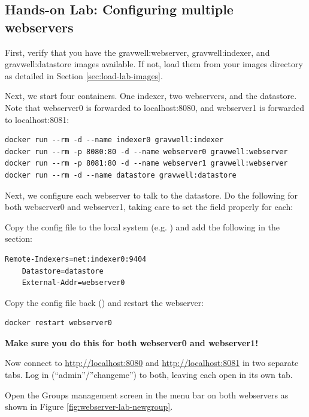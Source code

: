 \subsection{Hands-on Lab: Configuring multiple webservers}

First, verify that you have the gravwell:webserver, gravwell:indexer, and gravwell:datastore
images available. If not, load them from your images directory as detailed in
Section \ref{sec:load-lab-images}.

Next, we start four containers. One indexer, two webservers, and the
datastore. Note that webserver0 is forwarded to localhost:8080, and
webserver1 is forwarded to localhost:8081:

\begin{Verbatim}[breaklines=true]
docker run --rm -d --name indexer0 gravwell:indexer
docker run --rm -p 8080:80 -d --name webserver0 gravwell:webserver
docker run --rm -p 8081:80 -d --name webserver1 gravwell:webserver
docker run --rm -d --name datastore gravwell:datastore
\end{Verbatim}

Next, we configure each webserver to talk to the datastore. Do the
following for both webserver0 and webserver1, taking care to set the
 field properly for each:

Copy the config file to the local system
(e.g. )
and add the following in the \code{[Global]} section:

\begin{Verbatim}[breaklines=true]
    Remote-Indexers=net:indexer0:9404
    Datastore=datastore
    External-Addr=webserver0
\end{Verbatim}

Copy the config file back ()
and restart the webserver:

\begin{Verbatim}[breaklines=true]
docker restart webserver0
\end{Verbatim}

\textbf{Make sure you do this for both webserver0 and webserver1!}

Now connect to
\href{http://localhost:8080}{http://localhost:8080} and
\href{http://localhost:8081}{http://localhost:8081} in two separate tabs.
Log in (``admin''/''changeme'') to both,
leaving each open in its own tab.

Open the Groups management screen in the menu bar on both webservers as shown in Figure \ref{fig:webserver-lab-newgroup}.

